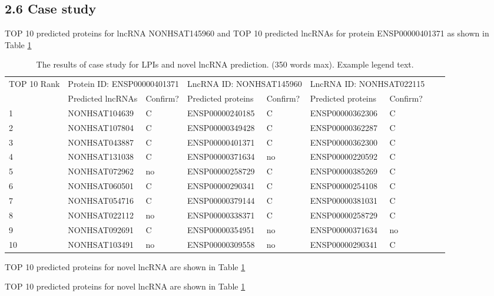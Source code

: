 \documentclass[fleqn,10pt]{wlscirep}
\begin{document}
\subsection*{2.6 Case study}
TOP 10 predicted proteins for lncRNA NONHSAT145960 and TOP 10 predicted lncRNAs for protein ENSP00000401371 as shown in Table \ref{tab:caseStudy1}
\begin{table}[ht]
\centering
\caption{\label{tab:caseStudy1} The results of case study for LPIs and novel lncRNA prediction. (350 words max). Example legend text.}
\begin{tabular}{|l|l|l|l|l|l|l|l|l|}
\hline
\multirow{2}{*}{TOP 10 Rank} & \multicolumn{2}{|l|}{Protein ID: ENSP00000401371} & \multicolumn{2}{|l|}{LncRNA ID: NONHSAT145960}& \multicolumn{2}{|l|}{LncRNA ID: NONHSAT022115}\\
\cline{2-7}
 & Predicted lncRNAs & Confirm? & Predicted proteins & Confirm? & Predicted proteins & Confirm? \\
\hline
1 & NONHSAT104639  & C & ENSP00000240185 & C & ENSP00000362306 & C
\\
2 & NONHSAT107804 & C & ENSP00000349428	& C & ENSP00000362287 & 	C
\\
3 & NONHSAT043887  & C & ENSP00000401371	& C & ENSP00000362300 & 	C
\\
4 & NONHSAT131038  & C & ENSP00000371634	& no & ENSP00000220592  & C
\\
5 & NONHSAT072962  & no & ENSP00000258729 & C & ENSP00000385269  & C
\\
6 & NONHSAT060501  & C & ENSP00000290341	& C & ENSP00000254108  & C
\\
7 & NONHSAT054716 & C & ENSP00000379144 & C & ENSP00000381031 & C
\\
8 & NONHSAT022112 & no & ENSP00000338371 & C & ENSP00000258729 & C
\\
9 & NONHSAT092691 & C & ENSP00000354951	& no & ENSP00000371634 & no
\\
10 & NONHSAT103491 & no & ENSP00000309558 & no & ENSP00000290341  & C
\\
\hline
\end{tabular}
\end{table}

TOP 10 predicted proteins for novel lncRNA are shown in Table \ref{tab:caseStudy1}

TOP 10 predicted proteins for novel lncRNA are shown in Table \ref{tab:caseStudy1}
\end{document}
